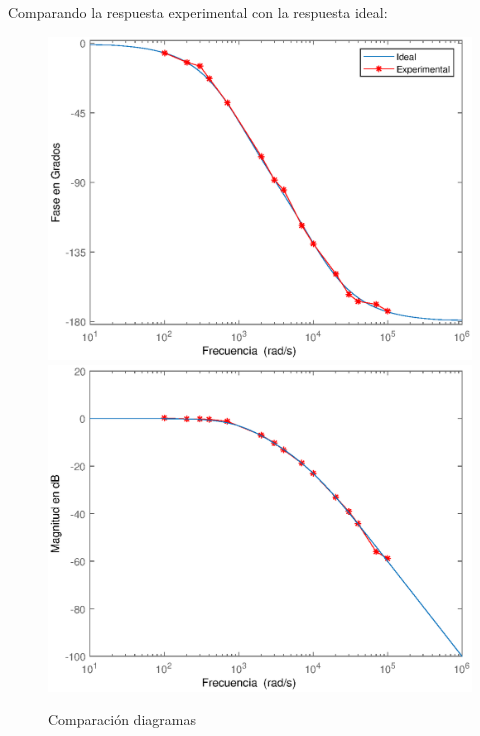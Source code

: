 \documentclass[10pt,a4paper]{article} %
\begin{document}

Comparando la respuesta experimental con la respuesta ideal:
\begin{figure}[H]
\begin{center}
	\includegraphics[scale=0.4]{compmag}
	\includegraphics[scale=0.4]{compfase}
	\caption{Comparación diagramas}
\end{center}
\end{figure}
\end{document}
